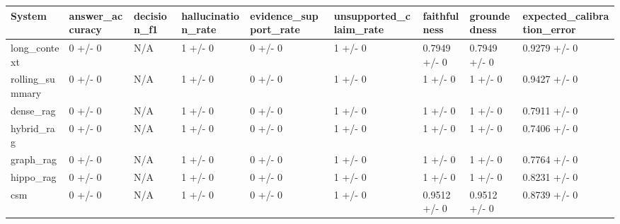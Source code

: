 \begin{tabular}{lllllllll}
System & answer_accuracy & decision_f1 & hallucination_rate & evidence_support_rate & unsupported_claim_rate & faithfulness & groundedness & expected_calibration_error \\
\hline
long\_context & 0 +/- 0 & N/A & 1 +/- 0 & 0 +/- 0 & 1 +/- 0 & 0.7949 +/- 0 & 0.7949 +/- 0 & 0.9279 +/- 0 \\
rolling\_summary & 0 +/- 0 & N/A & 1 +/- 0 & 0 +/- 0 & 1 +/- 0 & 1 +/- 0 & 1 +/- 0 & 0.9427 +/- 0 \\
dense\_rag & 0 +/- 0 & N/A & 1 +/- 0 & 0 +/- 0 & 1 +/- 0 & 1 +/- 0 & 1 +/- 0 & 0.7911 +/- 0 \\
hybrid\_rag & 0 +/- 0 & N/A & 1 +/- 0 & 0 +/- 0 & 1 +/- 0 & 1 +/- 0 & 1 +/- 0 & 0.7406 +/- 0 \\
graph\_rag & 0 +/- 0 & N/A & 1 +/- 0 & 0 +/- 0 & 1 +/- 0 & 1 +/- 0 & 1 +/- 0 & 0.7764 +/- 0 \\
hippo\_rag & 0 +/- 0 & N/A & 1 +/- 0 & 0 +/- 0 & 1 +/- 0 & 1 +/- 0 & 1 +/- 0 & 0.8231 +/- 0 \\
csm & 0 +/- 0 & N/A & 1 +/- 0 & 0 +/- 0 & 1 +/- 0 & 0.9512 +/- 0 & 0.9512 +/- 0 & 0.8739 +/- 0 \\
\end{tabular}
